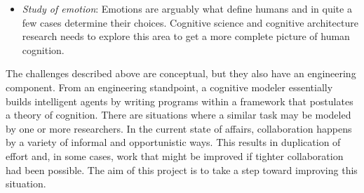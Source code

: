 \begin{itemize}
\item \emph{Study of emotion}: Emotions are arguably what define
  humans and in quite a few cases determine their choices.  Cognitive
  science and cognitive architecture research needs to explore this
  area to get a more complete picture of human cognition.



\end{itemize}


The challenges described above are conceptual, but they also have an
engineering component.  From an engineering standpoint, a cognitive
modeler essentially builds intelligent agents by writing programs
within a framework that postulates a theory of cognition. There are
situations where a similar task may be modeled by one or more
researchers.  In the current state of affairs, collaboration happens
by a variety of informal and opportunistic ways.  This results in
duplication of effort and, in some cases, work that might be improved
if tighter collaboration had been possible.  The aim of this project
is to take a step toward improving this situation.


